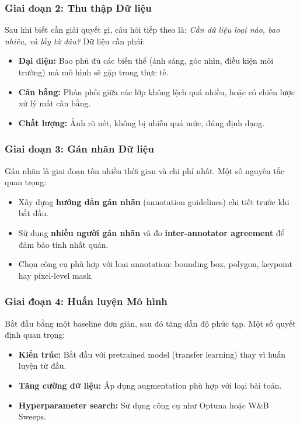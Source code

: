 \subsubsection{Giai đoạn 2: Thu thập Dữ liệu}

Sau khi biết cần giải quyết gì, câu hỏi tiếp theo là: \textit{Cần dữ liệu loại nào, bao nhiêu, và lấy từ đâu?} Dữ liệu cần phải:

\begin{itemize}
    \item \textbf{Đại diện:} Bao phủ đủ các biến thể (ánh sáng, góc nhìn, điều kiện môi trường) mà mô hình sẽ gặp trong thực tế.
    \item \textbf{Cân bằng:} Phân phối giữa các lớp không lệch quá nhiều, hoặc có chiến lược xử lý mất cân bằng.
    \item \textbf{Chất lượng:} Ảnh rõ nét, không bị nhiễu quá mức, đúng định dạng.
\end{itemize}

\subsubsection{Giai đoạn 3: Gán nhãn Dữ liệu}

Gán nhãn là giai đoạn tốn nhiều thời gian và chi phí nhất. Một số nguyên tắc quan trọng:

\begin{itemize}
    \item Xây dựng \textbf{hướng dẫn gán nhãn} (annotation guidelines) chi tiết trước khi bắt đầu.
    \item Sử dụng \textbf{nhiều người gán nhãn} và đo \textbf{inter-annotator agreement} để đảm bảo tính nhất quán.
    \item Chọn công cụ phù hợp với loại annotation: bounding box, polygon, keypoint hay pixel-level mask.
\end{itemize}

\subsubsection{Giai đoạn 4: Huấn luyện Mô hình}

Bắt đầu bằng một baseline đơn giản, sau đó tăng dần độ phức tạp. Một số quyết định quan trọng:

\begin{itemize}
    \item \textbf{Kiến trúc:} Bắt đầu với pretrained model (transfer learning) thay vì huấn luyện từ đầu.
    \item \textbf{Tăng cường dữ liệu:} Áp dụng augmentation phù hợp với loại bài toán.
    \item \textbf{Hyperparameter search:} Sử dụng công cụ như Optuna hoặc W\&B Sweeps.
\end{itemize}

